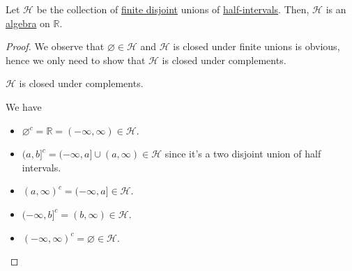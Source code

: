 \begin{lemma}
	Let \(\mathcal{H} \) be the collection of \underline{finite disjoint} unions of \hyperref[def:half-intervals]{half-intervals}. Then, \(\mathcal{H} \)
	is an \hyperref[def:algebra]{algebra} on \(\mathbb{R} \).
\end{lemma}
\begin{proof}
	We observe that \(\varnothing \in \mathcal{H} \) and \(\mathcal{H} \) is closed under finite unions is obvious, hence
	we only need to show that \(\mathcal{H} \) is closed under complements.
	\begin{claim}
		\(\mathcal{H} \) is closed under complements.
	\end{claim}
	\begin{explanation}
		We have
		\begin{itemize}
			\item \(\varnothing ^{c} = \mathbb{R} = (-\infty , \infty )\in \mathcal{H}\).
			\item \((a, b]^{c} = (-\infty , a] \cup (a, \infty )\in\mathcal{H} \) since it's a two disjoint union of half intervals.
			\item \((a, \infty )^{c} = (-\infty , a]\in\mathcal{H}\).
			\item \((-\infty , b]^{c} = (b, \infty )\in\mathcal{H} \).
			\item \((-\infty , \infty )^{c} = \varnothing \in\mathcal{H}\).
		\end{itemize}
	\end{explanation}
\end{proof}


